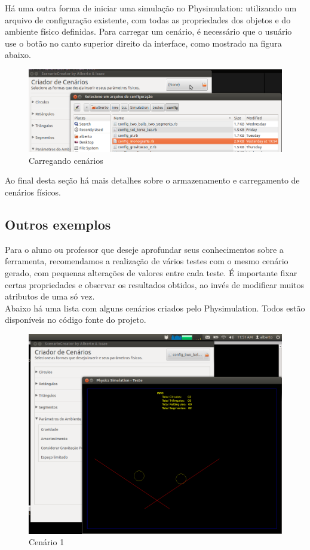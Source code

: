 Há uma outra forma de iniciar uma simulação no Physimulation: utilizando um arquivo de configuração existente, com todas as propriedades dos objetos e do ambiente físico definidas. Para carregar um cenário, é necessário que o usuário use o botão no canto superior direito da interface, como mostrado na figura abaixo. \\

\begin{figure}[H]
	\centering
	\includegraphics[scale=0.4]{images/physimulation-loading.png}
	\caption{Carregando cenários}
\end{figure}

Ao final desta seção há mais detalhes sobre o armazenamento e carregamento de cenários físicos.

\subsection{Outros exemplos}

Para o aluno ou professor que deseje aprofundar seus conhecimentos sobre a ferramenta, recomendamos a realização de vários testes com o mesmo cenário gerado, com pequenas alterações de valores entre cada teste. É importante fixar certas propriedades e observar os resultados obtidos, ao invés de modificar muitos atributos de uma só vez. \\

Abaixo há uma lista com alguns cenários criados pelo Physimulation. Todos estão disponíveis no código fonte do projeto. \\

\begin{figure}[H]
	\centering
	\includegraphics[scale=0.3]{images/cenario-two-balls.png}
	\caption{Cenário 1}
\end{figure}  

